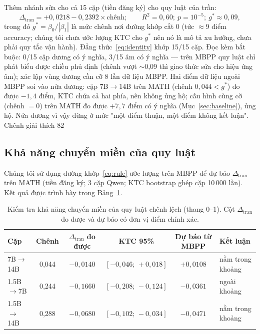 \documentclass[12pt,a4paper]{article}
\newcommand{\mucB}{\textsuperscript{\,(mức B)}}
\newcommand{\dceil}{\Delta_{\mathrm{tran}}}
\begin{document}
Thêm nhánh sửa cho cả 15 cặp (tiền đăng ký) cho quy luật của trần:
\begin{equation}\label{eq:rule}
\dceil = +0{,}0218 - 0{,}2392 \times \text{chênh};\qquad R^2 = 0{,}60;\ p = 10^{-5};\
g^\ast \approx 0{,}09,
\end{equation}
trong đó \(g^\ast = \beta_0/|\beta_1|\) là mức chênh nơi đường khớp cắt 0 (tức \(\approx 9\) điểm accuracy; chúng tôi chưa ước lượng KTC cho \(g^\ast\) nên nó là mô tả xu hướng, chưa phải quy tắc vận hành). Đẳng thức~\eqref{eq:identity} khớp 15/15 cặp. Đọc kèm bắt buộc: 0/15 cặp dương có ý nghĩa, 3/15 âm có ý nghĩa --- trên MBPP quy luật chỉ phát biểu được chiều phủ định (chênh vượt \(\sim\)0,09 thì giao thức sửa cho hiệu ứng âm); xác lập vùng dương cần cỡ 8 lần dữ liệu MBPP. Hai điểm dữ liệu ngoài MBPP soi vào nửa dương: cặp 7B\(\to\)14B trên MATH (chênh \(0{,}044 < g^\ast\)) đo được \(-1{,}4\) điểm, KTC chứa cả hai phía, nên không ủng hộ; cấu hình cùng cỡ (chênh \(=0\)) trên MATH đo được \(+7{,}7\) điểm có ý nghĩa (Mục~\ref{sec:baseline}), ủng hộ. Nửa dương vì vậy dừng ở mức "một điểm thuận, một điểm không kết luận". Chênh giải thích 82%

\subsection{Khả năng chuyển miền của quy luật}\label{sec:transfer}

Chúng tôi sử dụng đường khớp~\eqref{eq:rule} ước lượng trên MBPP để dự báo \(\dceil\) trên MATH (tiền đăng ký; 3 cặp Qwen; KTC bootstrap ghép cặp 10\,000 lần). Kết quả được trình bày trong Bảng~\ref{tab:transfer}.

\begin{table}[htbp]
\centering
\small
\begin{tabular}{@{}l c c c c l@{}}
\toprule
Cặp & Chênh & \(\dceil\) đo được & KTC 95\% & Dự báo từ MBPP & Kết luận\\
\midrule
7B\(\to\)14B & 0,044 & \(-0{,}0140\) & \([-0{,}046;\,+0{,}018]\) & \(+0{,}0108\) & nằm trong khoảng\\
1.5B\(\to\)7B & 0,244 & \(-0{,}1660\) & \([-0{,}208;\,-0{,}124]\) & \(-0{,}0361\) & ngoài khoảng\\
1.5B\(\to\)14B & 0,288 & \(-0{,}0680\) & \([-0{,}102;\,-0{,}034]\) & \(-0{,}0471\) & nằm trong khoảng\\
\bottomrule
\end{tabular}
\caption{Kiểm tra khả năng chuyển miền của quy luật chênh lệch (thang 0--1). Cột \(\dceil\) đo được và dự báo có đơn vị điểm chính xác.}
\label{tab:transfer}
\end{table}
\end{document}
